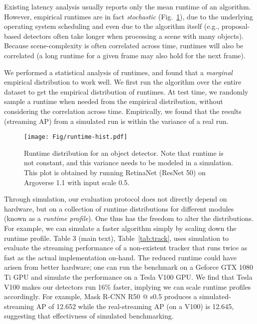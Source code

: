  Existing latency analysis \cite{redmon2016you,Liu2016SSDSS,lin2017focal} usually reports only the mean runtime of an algorithm. However, empirical runtimes are in fact {\em stochastic} (Fig.~\ref{fig:runtime}), due to the underlying operating system scheduling and even due to the algorithm itself (e.g., proposal-based detectors often take longer when processing a scene with many objects). Because scene-complexity is often correlated across time, runtimes will also be correlated (a long runtime for a given frame may also hold for the next frame).


We performed a statistical analysis of runtimes, and found that a {\em marginal} empirical distribution to work well.
We first run the algorithm over the entire dataset to get the empirical distribution of runtimes. At test time, we randomly sample a runtime when needed from the empirical distribution, without considering the correlation across time. Empirically, we found that the results (streaming AP) from a simulated run is within the variance of a real run.

\begin{figure}[]
\centering
\texttt{[image: Fig/runtime-hist.pdf]}

\caption{Runtime distribution for an object detector. Note that runtime is not constant, and this variance needs to be modeled in a simulation. This plot is obtained by running RetinaNet (ResNet 50) \cite{lin2017focal} on Argoverse 1.1 \cite{Argoverse} with input scale 0.5.}
\label{fig:runtime}
\end{figure}


Through simulation, our evaluation protocol does not directly depend on hardware, but on a collection of runtime distributions for different modules (known as a {\em runtime profile}). One thus has the freedom to alter the distributions. For example, we can simulate a faster algorithm simply by scaling down the runtime profile.
\ifstandalonesupplement
    Table 3 (main text),
\else
    Table~\ref{tab:track},
\fi
uses simulation to evaluate the streaming performance of a non-existent tracker that runs twice as fast as the actual implementation on-hand. The reduced runtime could have arisen from better hardware; one can run the benchmark on a Geforce GTX 1080 Ti GPU and simulate the performance on a Tesla V100 GPU. We find that Tesla V100 makes our detectors run 16\% faster, implying we can scale runtime profiles accordingly. For example, Mask R-CNN R50 @ s0.5 produces a simulated-streaming AP of 12.652 while the real-streaming AP (on a V100) is 12.645, suggesting that effectivness of simulated benchmarking. 



